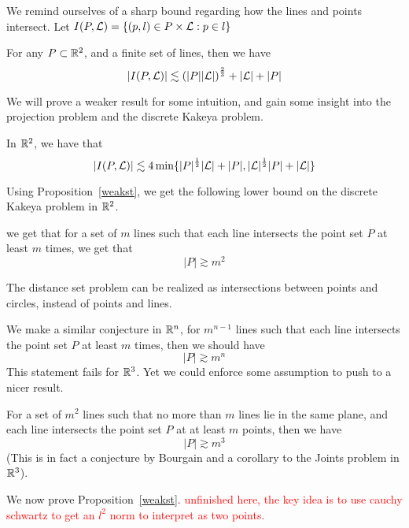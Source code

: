 We remind ourselves of a sharp bound regarding how the lines and points intersect. Let $I(P,\mathcal{L})=\{(p,l)\in P\times \mathcal{L}: p\in l\}$ 
\begin{theorem}
    For any $P\subset\mathbb{R}^2$, and a finite set of lines, then we have
    \begin{equation*}
        |I(P,\mathcal{L})|\lesssim \left(|P||\mathcal{L}|\right)^\frac{2}{3}+|\mathcal{L}|+|P|
    \end{equation*}
\end{theorem}
We will prove a weaker result for some intuition, and gain some insight into the projection problem and the discrete Kakeya problem.
\begin{proposition}[Weaker S-T]
    \label{weakst}
    In $\mathbb{R}^2$, we have that
    \begin{equation}
        |I(P,\mathcal{L})|\lesssim 4\min\{|P|^\frac{1}{2}|\mathcal{L}|+|P|, |\mathcal{L}|^\frac{1}{2}|P|+|\mathcal{L}|\}
    \end{equation}
\end{proposition}
Using Proposition~\ref{weakst}, we get the following lower bound on the discrete Kakeya problem in $\mathbb{R}^2$.
\begin{corollary}
    we get that for a set of $m$ lines such that each line intersects the point set $P$ at least $m$ times, we get that
    \begin{equation*}
        |P|\gtrsim m^2
    \end{equation*}
\end{corollary}
\begin{note}
    The distance set problem can be realized as intersections between points and circles, instead of points and lines.
\end{note}
We make a similar conjecture in $\mathbb{R}^n$, for $m^{n-1}$ lines such that each line intersects the point set $P$ at least $m$ times, then we should have
\begin{equation*}
    |P|\gtrsim m^n
\end{equation*}
This statement fails for $\mathbb{R}^3$. Yet we could enforce some assumption to push to a nicer result.
\begin{theorem}
    For a set of $m^2$ lines such that no more than $m$ lines lie in the same plane, and each line intersects the point set $P$ at at least $m$ points, then we have
    \begin{equation*}
        |P|\gtrsim m^3
    \end{equation*}
    (This is in fact a conjecture by Bourgain and a corollary to the Joints problem in $\mathbb{R}^3$).
\end{theorem}
We now prove Proposition~\ref{weakst}. \textcolor{red}{unfinished here, the key idea is to use cauchy schwartz to get an $l^2$ norm to interpret as two points. } 

